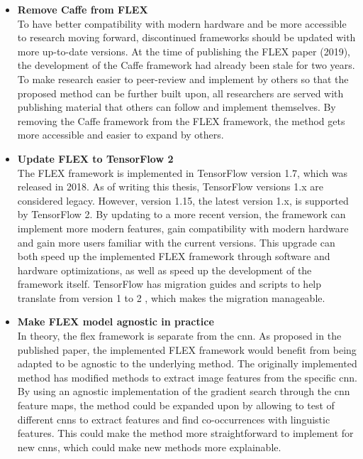             \begin{itemize}
                \item \textbf{Remove Caffe from FLEX\\} 
                To have better compatibility with modern hardware and be more accessible to research moving forward, discontinued frameworks should be updated with more up-to-date versions. At the time of publishing the FLEX paper (2019), the development of the Caffe framework had already been stale for two years. To make research easier to peer-review and implement by others so that the proposed method can be further built upon, all researchers are served with publishing material that others can follow and implement themselves. By removing the Caffe framework from the FLEX framework, the method gets more accessible and easier to expand by others.
                

                \item \textbf{Update FLEX to TensorFlow 2\\}
                The FLEX framework is implemented in TensorFlow version 1.7, which was released in 2018. As of writing this thesis, TensorFlow versions 1.x are considered legacy. However, version 1.15, the latest version 1.x, is supported by TensorFlow 2. By updating to a more recent version, the framework can implement more modern features, gain compatibility with modern hardware and gain more users familiar with the current versions. This upgrade can both speed up the implemented FLEX framework through software and hardware optimizations, as well as speed up the development of the framework itself. 
                TensorFlow has migration guides and scripts to help translate from version 1 to 2 \cite{MigrateTensorFlowTensorFlow}, which makes the migration manageable. 
    

                \item \textbf{Make FLEX model agnostic in practice\\}
                In theory, the \gls{flex} framework is separate from the \gls{cnn}. As proposed in the published paper, the implemented FLEX framework would benefit from being adapted to be agnostic to the underlying method. The originally implemented method has modified methods to extract image features from the specific \gls{cnn}. By using an agnostic implementation of the gradient search through the \gls{cnn} feature maps, the method could be expanded upon by allowing to test of different \glspl{cnn} to extract features and find co-occurrences with linguistic features. This could make the method more straightforward to implement for new \glspl{cnn}, which could make new methods more explainable.

            \end{itemize}

